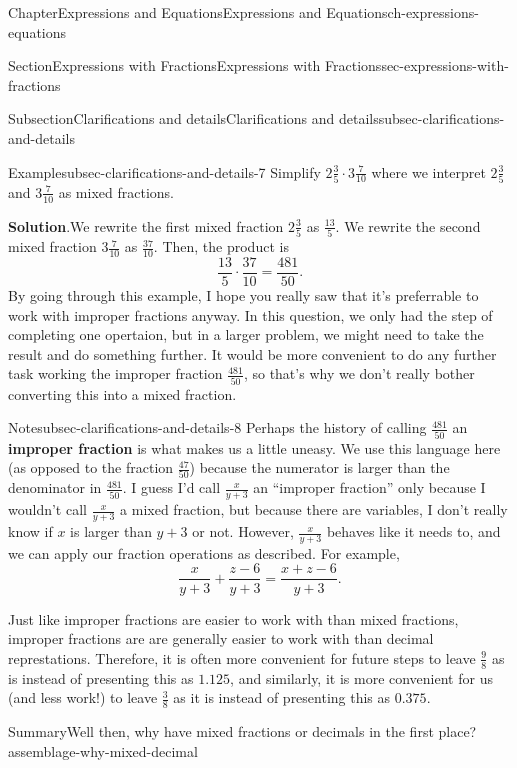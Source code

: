 \documentclass[twoside,11pt,]{book}
\newcommand{\blocktitlefont}{\relax}
\newcommand{\terminology}[1]{\textbf{#1}}
\numberwithin{equation}{chapter}
\begin{document}
\begin{chapterptx}{Chapter}{Expressions and Equations}{}{Expressions and Equations}{}{}{ch-expressions-equations}
\begin{sectionptx}{Section}{Expressions with Fractions}{}{Expressions with Fractions}{}{}{sec-expressions-with-fractions}
\begin{subsectionptx}{Subsection}{Clarifications and details}{}{Clarifications and details}{}{}{subsec-clarifications-and-details}
\begin{example}{Example}{}{subsec-clarifications-and-details-7}
Simplify \(2 \frac{3}{5} \cdot 3 \frac{7}{10}\) where we interpret \(2 \frac{3}{5}\) and \(3 \frac{7}{10}\) as mixed fractions.%
\par\smallskip%
\noindent\textbf{\blocktitlefont Solution}.\hypertarget{subsec-clarifications-and-details-7-2}{}\quad{}We rewrite the first mixed fraction \(2 \frac{3}{5}\) as \(\frac{13}{5}\). We rewrite the second mixed fraction \(3 \frac{7}{10}\) as \(\frac{37}{10}\). Then, the product is%
\begin{equation*}
\frac{13}{5} \cdot \frac{37}{10} = \frac{481}{50}.
\end{equation*}
By going through this example, I hope you really saw that it's preferrable to work with improper fractions anyway. In this question, we only had the step of completing one opertaion, but in a larger problem, we might need to take the result and do something further. It would be more convenient to do any further task working the improper fraction \(\frac{481}{50}\), so that's why we don't really bother converting this into a mixed fraction.%
\end{example}
\begin{note}{Note}{}{subsec-clarifications-and-details-8}%
Perhaps the history of calling \(\frac{481}{50}\) an \terminology{improper fraction} is what makes us a little uneasy. We use this language here (as opposed to the fraction \(\frac{47}{50}\)) because the numerator is larger than the denominator in \(\frac{481}{50}\). I guess I'd call \(\frac{x}{y+3}\) an ``improper fraction'' only because I wouldn't call \(\frac{x}{y+3}\) a mixed fraction, but because there are variables, I don't really know if \(x\) is larger than \(y+3\) or not. However, \(\frac{x}{y+3}\) behaves like it needs to, and we can apply our fraction operations as described. For example,%
\begin{equation*}
\frac{x}{y+3} + \frac{z-6}{y+3} = \frac{x+z-6}{y+3}.
\end{equation*}
%
\end{note}
Just like improper fractions are easier to work with than mixed fractions, improper fractions are are generally easier to work with than decimal represtations. Therefore, it is often more convenient for future steps to leave \(\frac98\) as is instead of presenting this as \(1.125\), and similarly, it is more convenient for us (and less work!) to leave \(\frac38\) as it is instead of presenting this as \(0.375\).%
\begin{assemblage}{Summary}{Well then, why have mixed fractions or decimals in the first place?}{assemblage-why-mixed-decimal}%

\end{assemblage}
\end{subsectionptx}
\end{sectionptx}
\end{chapterptx}
\end{document}
